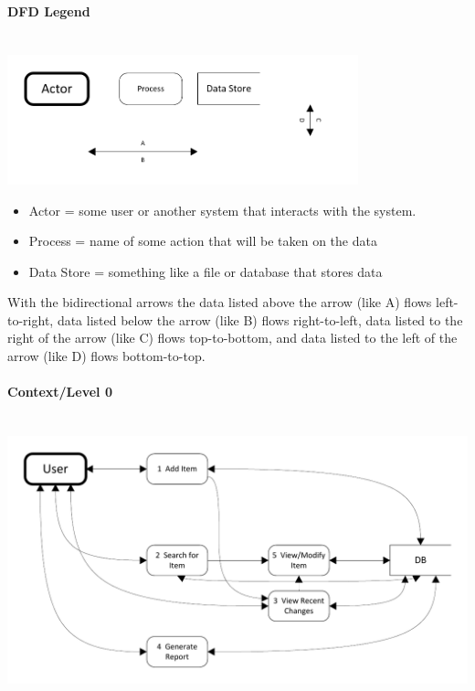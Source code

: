 \documentclass{article}
\begin{document}
\paragraph{DFD Legend}
~\\
\includegraphics[keepaspectratio, width=4in]{dfd_legend.pdf}\\
\begin{itemize}
\item Actor = some user or another system that interacts with the system.
\item Process = name of some action that will be taken on the data
\item Data Store = something like a file or database that stores data
\end{itemize}
With the bidirectional arrows the data listed above the arrow (like A) flows left-to-right, data listed below the arrow (like B) flows right-to-left, data listed to the right of the arrow (like C) flows top-to-bottom, and data listed to the left of the arrow (like D) flows bottom-to-top.

\paragraph{Context/Level 0}
\label{cfd}
~\\
\includegraphics[keepaspectratio, width=6.5in]{dfd_context_level0.pdf}\\
~\\
\end{document}
